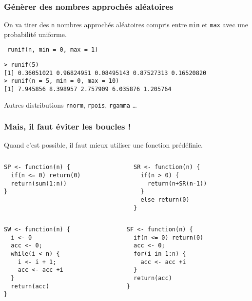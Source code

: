 \documentclass[10pt]{beamer}
\begin{document}
\begin{frame}[fragile]
  \frametitle{  Génèrer des nombres approchés aléatoires}
  On va tirer des \texttt{n} nombres approchés aléatoires compris entre \texttt{min} et \texttt{max} avec une probabilité uniforme.
  \begin{center}
    \alert{\texttt{ runif(n, min = 0, max = 1)}}
  \end{center}

    \begin{lstlisting}
> runif(5)
[1] 0.36051021 0.96824951 0.08495143 0.87527313 0.16520820
> runif(n = 5, min = 0, max = 10)
[1] 7.945856 8.398957 2.757909 6.035876 1.205764
\end{lstlisting}


\begin{block}{Autres distributions}
  \texttt{rnorm}, \texttt{rpois}, \texttt{rgamma} \dots 
\end{block}
\end{frame}


\begin{frame}[fragile]
  \frametitle{Mais, il faut éviter les boucles !}
  \begin{center}
    \alert{Quand c’est possible, il faut mieux utiliser une fonction prédéfinie.}
  \end{center}

\begin{columns}[t]
\begin{column}{0.48\textwidth}
  \begin{lstlisting}[style=editor]
SP <- function(n) {
  if(n <= 0) return(0)
  return(sum(1:n))
}    
\end{lstlisting}  
\end{column}
\begin{column}{0.48\textwidth}
  \begin{lstlisting}[style=editor]
SR <- function(n) {
  if(n > 0) {
    return(n+SR(n-1))
  }
  else return(0)
}    
  \end{lstlisting}
\end{column}
\end{columns}

\begin{columns}[t]
\begin{column}{0.48\textwidth}
  \begin{lstlisting}[style=editor]
SW <- function(n) {
  i <- 0
  acc <- 0;
  while(i < n) {
    i <- i + 1;
    acc <- acc +i
  }
  return(acc)
}
\end{lstlisting}
\end{column}
\begin{column}{0.48\textwidth}
  \begin{lstlisting}[style=editor]
SF <- function(n) {
  if(n <= 0) return(0)
  acc <- 0;
  for(i in 1:n) {
    acc <- acc +i
  }
  return(acc)
}
\end{lstlisting}
\end{column}
\end{columns}

\end{frame}
\end{document}
